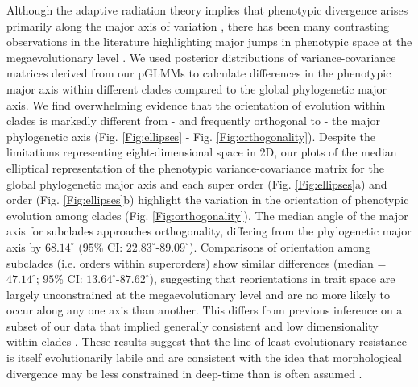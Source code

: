\documentclass[12pt,letterpaper]{article}
\begin{document}
Although the adaptive radiation theory implies that phenotypic divergence arises primarily along the major axis of variation \cite{marroig2005size}, there has been many contrasting observations in the literature highlighting major jumps in phenotypic space at the megaevolutionary level \cite{puttick2014high,cooney2017mega,venditti2011multiple}.
We used posterior distributions of variance-covariance matrices derived from our pGLMMs to calculate differences in the phenotypic major axis within different clades compared to the global phylogenetic major axis.
We find overwhelming evidence that the orientation of evolution within clades is markedly different from - and frequently orthogonal to - the major phylogenetic axis (Fig. \ref{Fig:ellipses} - Fig. \ref{Fig:orthogonality}).
Despite the limitations representing eight-dimensional space in 2D, our plots of the median elliptical representation of the phenotypic variance-covariance matrix for the global phylogenetic major axis and each super order (Fig. \ref{Fig:ellipses}a) and order (Fig. \ref{Fig:ellipses}b) highlight the variation in the orientation of phenotypic evolution among clades (Fig. \ref{Fig:orthogonality}).
The median angle of the major axis for subclades approaches orthogonality, differing from the phylogenetic major axis by $68.14^\circ$ ($95$\% CI: $22.83^\circ$-$89.09^\circ$).
Comparisons of orientation among subclades (i.e. orders within superorders) show similar differences (median = $47.14^\circ$; $95$\% CI: $13.64^\circ$-$87.62^\circ$), suggesting that reorientations in trait space are largely unconstrained at the megaevolutionary level and are no more likely to occur along any one axis than another.
This differs from previous inference on a subset of our data that implied generally consistent and low dimensionality within clades \cite{cooney2017mega}.
These results suggest that the line of least evolutionary resistance is itself evolutionarily labile and are consistent with the idea that morphological divergence may be less constrained in deep-time than is often assumed \cite{venditti2011multiple}.
\end{document}
